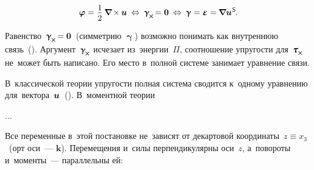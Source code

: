 \begin{otherlanguage}{russian}
\nopagebreak\vspace{-0.75em}\begin{equation}
\fieldofrotations = \displaystyle \onehalf \hspace{0.4ex} \boldnabla \hspace{-0.16ex} \times \hspace{-0.1ex} \fieldofdisplacements 
\:\Leftrightarrow\:
\bm{\upgamma}_{\hspace{-0.16ex}\Xcompanion} \hspace{-0.32ex} = \bm{0}
\:\Leftrightarrow\:
\bm{\upgamma} = \mathboldepsilon = \hspace{-0.12ex} \boldnabla {\fieldofdisplacements}^{\hspace{0.1ex}\mathsf{S}} \hspace{-0.25ex}.
\end{equation}

Равенство~${\bm{\upgamma}_{\hspace{-0.16ex}\Xcompanion} \hspace{-0.32ex} = \bm{0}}$~(симметрию $\bm{\upgamma}$) возможно понимать как внутреннюю связь~(). Аргумент~${\bm{\upgamma}_{\hspace{-0.16ex}\Xcompanion}}$ исчезает из~энергии~$\Pi$, соотношение упругости для~${\mathboldtau_{\hspace{-0.1ex}\Xcompanion}}$ не~может быть написано. Его место в~полной системе занимает уравнение связи.

В~классической теории упругости полная система сводится к~одному уравнению для~вектора~$\bm{u}$~(). В~моментной теории

...





\label{para:planedeformation.cosseratcontinuum}

Все переменные в~этой постановке не~зависят от декартовой координаты~${z \equiv x_3}$~(орт оси~--- $\bm{k}$). Перемещения и~силы перпендикулярны оси~$z$, а~повороты и~моменты~--- параллельны ей:


\end{otherlanguage}
